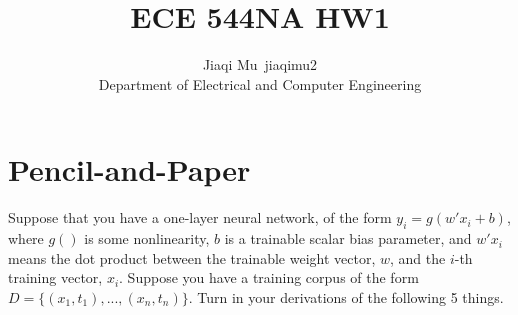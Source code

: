 \documentclass[11pt]{article}
\newcommand{\1}{\mathbf{1}}
\begin{document}

\title{ECE 544NA HW1}%
\author{Jiaqi Mu~jiaqimu2 \\ [8pt]%
Department of Electrical and Computer Engineering} %

\maketitle

\section{Pencil-and-Paper\label{sec:1}}
Suppose that you have a one-layer neural network, of the form $y_i = g(w'x_i + b)$, where $g()$ is some nonlinearity, $b$ is a trainable scalar bias parameter, and $w'x_i$ means the dot product between the trainable weight vector, $w$, and the $i$-th training vector, $x_i$. Suppose you have a training corpus of the form $D=\{(x_1, t_1), ... , (x_n, t_n)\}$. Turn in your derivations of the following 5 things.
\end{document}
